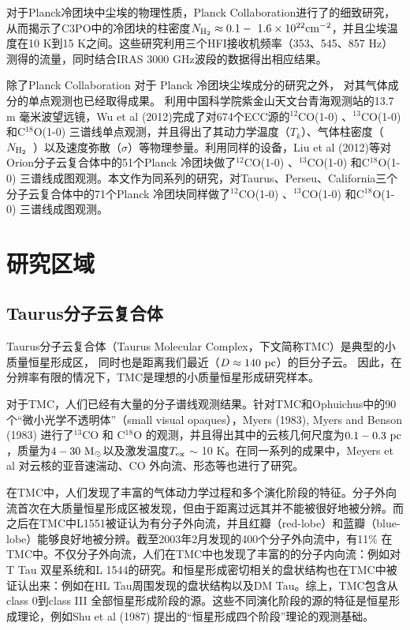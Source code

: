 \documentclass[UTF8, nocolorlinks]{pkuthss}
\newcommand{\cob}{$^{13}$CO }
\newcommand{\coc}{C$^{18}$O }
\newcommand{\coaa}{$^{12}$CO(1-0) }
\newcommand{\cobb}{$^{13}$CO(1-0) }
\newcommand{\cocc}{C$^{18}$O(1-0) }
\newcommand{\texc}{$T_{\rm {ex}}$ }
\newcommand{\nhyd}{$N_{\rm H_2}$\ }
\begin{document}
		对于Planck冷团块中尘埃的物理性质，Planck Collaboration进行了的细致研究，从而揭示了C3PO中的冷团块的柱密度$N_ {\rm H_2} \approx 0.1 \rm - \ 1.6 \times 10^{22} \rm cm^{-2}$，并且尘埃温度在10 K到15 K之间\supercite{2011A&A...536A..23P}。这些研究利用三个HFI接收机频率（353、545、857 Hz）测得的流量，同时结合IRAS 3000 GHz波段的数据得出相应结果\supercite{2011A&A...536A..23P,2011A&A...536A..22P}。

		除了Planck Collaboration 对于 Planck 冷团块尘埃成分的研究之外， 对其气体成分的单点观测也已经取得成果。 利用中国科学院紫金山天文台青海观测站的13.7 m 毫米波望远镜，Wu et al (2012)完成了对674个ECC源的\coaa 、\cobb  和\cocc  三谱线单点观测，并且得出了其动力学温度（$T_k$）、气体柱密度（\nhyd）以及速度弥散（$\sigma$）等物理参量\supercite{wu2012gas}。利用同样的设备，Liu et al (2012)等对Orion分子云复合体中的51个Planck 冷团块做了\coaa 、\cobb  和\cocc  三谱线成图观测\supercite{LiuTie}。本文作为同系列的研究，对Taurus、Perseu、California三个分子云复合体中的71个Planck 冷团块同样做了\coaa 、\cobb  和\cocc  三谱线成图观测。

	\section{研究区域}

		\subsection{Taurus分子云复合体}

			Taurus分子云复合体（Taurus Molecular Complex，下文简称TMC）是典型的小质量恒星形成区， 同时也是距离我们最近（$D\approx 140\rm\ pc$）的巨分子云\supercite{1987ApJ...322..706D}。 因此，在分辨率有限的情况下，TMC是理想的小质量恒星形成研究样本。

			对于TMC，人们已经有大量的分子谱线观测结果。针对TMC和Ophuichus中的90个“微小光学不透明体”（small visual opaques），Myers (1983), Myers and Benson (1983) 进行了\cob 和 \coc 的观测，并且得出其中的云核几何尺度为$0.1-0.3 \ \rm pc$，质量为$4-30\ \rm M_\odot$以及激发温度\texc $\sim$ 10 K\supercite{1983ApJ...264..517M,1983ApJ...266..309M}。在同一系列的成果中，Meyers et al 对云核的亚音速湍动、CO 外向流、形态等也进行了研究\supercite{1983ApJ...270..105M,1988ApJ...324..907M,1991ApJ...376..561M}。

			在TMC中，人们发现了丰富的气体动力学过程和多个演化阶段的特征。分子外向流首次在大质量恒星形成区被发现，但由于距离过远其并不能被很好地被分辨\supercite{1976ApJ...209L.137Z}。而之后在TMC中L1551被证认为有分子外向流，并且红瓣（red-lobe）和蓝瓣（blue-lobe）能够良好地被分辨\supercite{1980ApJ...239L..17S}。截至2003年2月发现的400个分子外向流中，有11\% 在TMC中\supercite{2004A&A...426..503W}。不仅分子外向流，人们在TMC中也发现了丰富的的分子内向流：例如对T Tau 双星系统\supercite{1994ApJ...425L..45V}和L 1544的研究\supercite{1998ApJ...504..900T}。和恒星形成密切相关的盘状结构也在TMC中被证认出来：例如在HL Tau周围发现的盘状结构\supercite{1991ApJ...382L..31S}以及DM Tau\supercite{1995ApJ...453..384S}。综上，TMC包含从class 0到class III 全部恒星形成阶段的源。这些不同演化阶段的源的特征是恒星形成理论，例如Shu et al (1987) 提出的“恒星形成四个阶段”理论\supercite{shu1987star}的观测基础。
\end{document}
